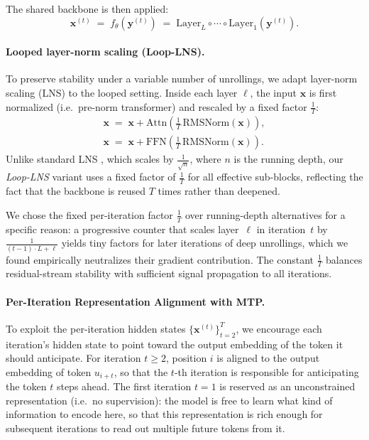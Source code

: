 The shared backbone is then applied:
\begin{equation}
  \mathbf{x}^{(t)} \;=\; f_\theta\!\left(\mathbf{y}^{(t)}\right)
                    \;=\; \mathrm{Layer}_L \circ \cdots \circ \mathrm{Layer}_1\!\left(\mathbf{y}^{(t)}\right).
\end{equation}


\paragraph{Looped layer-norm scaling (Loop-LNS).}
To preserve stability under a variable number of unrollings, we adapt layer-norm scaling (LNS) \citep{sun2026curse} to the looped setting. Inside each layer $\ell$, the input $\mathbf{x}$ is first normalized (i.e.~pre-norm transformer) and rescaled by a fixed factor $\frac{1}{T}$:
\begin{align}
  \mathbf{x} \;=\; \mathbf{x} + \mathrm{Attn}\!\left(\tfrac{1}{T}\,\mathrm{RMSNorm}(\mathbf{x})\right),
  \\
  \mathbf{x} \;=\; \mathbf{x} + \mathrm{FFN}\!\left(\tfrac{1}{T}\,\mathrm{RMSNorm}(\mathbf{x})\right).
\end{align}
Unlike standard LNS \citep{sun2026curse}, which scales by $\frac{1}{\sqrt{n}}$, where $n$ is the running depth, our \emph{Loop-LNS} variant uses a fixed factor of $\frac{1}{T}$ for all 
effective sub-blocks, reflecting the fact that the backbone is reused $T$ times rather than deepened.

We chose the fixed per-iteration factor $\frac{1}{T}$ over running-depth alternatives for a specific reason: a progressive counter that scales layer~$\ell$ in iteration~$t$ by $\frac{1}{(t{-}1) \cdot L + \ell}$  yields tiny factors for later iterations of deep unrollings, which we found empirically neutralizes their gradient contribution. 
The constant $\frac{1}{T}$ balances residual-stream stability with sufficient signal propagation to all iterations.


\paragraph{Per-Iteration Representation Alignment with MTP. }
To exploit the per-iteration hidden states $\{\mathbf{x}^{(t)}\}_{t=2}^{T}$, we encourage each iteration's hidden state to point toward the output embedding of the token it should anticipate. 
For iteration $t {\geq} 2$, position $i$ is aligned to the output embedding of token $u_{i+t}$, so that the $t$-th iteration is responsible for anticipating the token $t$ steps ahead.
The first iteration $t{=}1$ is reserved as an unconstrained representation (i.e.~no supervision): the model is free to learn what kind of information to encode here, so that this representation is rich enough for subsequent iterations to read out multiple future tokens from it.


